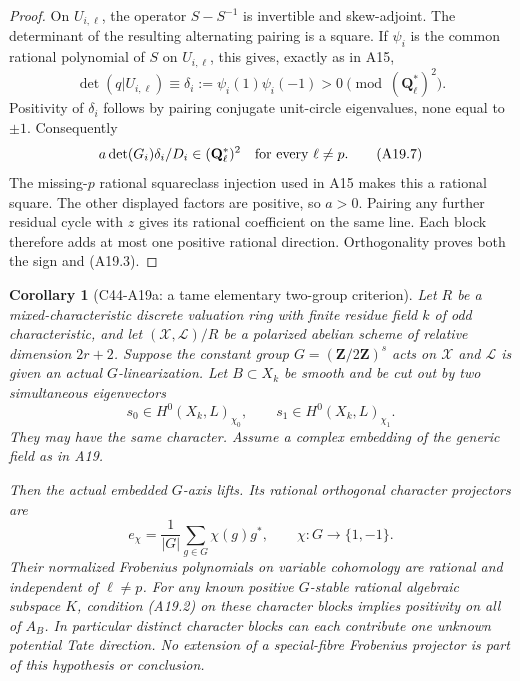 \documentclass[11pt]{article}
\newtheorem{corollary}[theorem]{Corollary}
\theoremstyle{remark}\newtheorem{remark}[theorem]{Remark}
\begin{document}
\begin{proof}
On $U_{i,\ell}$, the operator $S-S^{-1}$ is invertible
and skew-adjoint. The determinant of the resulting
alternating pairing is a square. If $\psi_i$ is the
common rational polynomial of $S$ on $U_{i,\ell}$, this
gives, exactly as in A15,
\[
 \det(q|U_{i,\ell})\equiv
      \delta_i:=\psi_i(1)\psi_i(-1)>0
                    \pmod{(\mathbf Q_\ell^*)^2}.
 \tag{A19.6}
\]
Positivity of $\delta_i$ follows by pairing conjugate
unit-circle eigenvalues, none equal to $\pm1$.
Consequently
\[
                 a\det(G_i)\delta_i/D_i
                  \in(\mathbf Q_\ell^*)^2
                         \quad\hbox{for every }\ell\ne p.
 \tag{A19.7}
\]
The missing-$p$ rational squareclass injection used in
A15 makes this a rational square. The other displayed
factors are positive, so $a>0$. Pairing any further
residual cycle with $z$ gives its rational coefficient
on the same line. Each block therefore adds at most
one positive rational direction. Orthogonality proves
both the sign and (A19.3).
\end{proof}

\begin{corollary}[C44-A19a: a tame elementary two-group criterion]
Let $R$ be a mixed-characteristic discrete valuation ring
with finite residue field $k$ of odd characteristic, and
let $(\mathcal X,\mathcal L)/R$ be a polarized abelian
scheme of relative dimension $2r+2$. Suppose the constant
group $G=(\mathbf Z/2\mathbf Z)^s$ acts on $\mathcal X$
and $\mathcal L$ is given an actual $G$-linearization.
Let $B\subset X_k$ be smooth and be cut out by two
simultaneous eigenvectors
\[
       s_0\in H^0(X_k,L)_{\chi_0},\qquad
       s_1\in H^0(X_k,L)_{\chi_1}.
 \tag{A19.8}
\]
They may have the same character. Assume a complex
embedding of the generic field as in A19.

Then the actual embedded $G$-axis lifts. Its rational
orthogonal character projectors are
\[
        e_\chi=\frac1{|G|}\sum_{g\in G}\chi(g)g^*,
             \qquad\chi:G\longrightarrow\{1,-1\}.
 \tag{A19.9}
\]
Their normalized Frobenius polynomials on variable
cohomology are rational and independent of $\ell\ne p$.
For any known positive $G$-stable rational algebraic
subspace $K$, condition (A19.2) on these character
blocks implies positivity on all of $A_B$.
In particular distinct character blocks can each
contribute one unknown potential Tate direction.
No extension of a special-fibre Frobenius projector
is part of this hypothesis or conclusion.
\end{corollary}
\end{document}
